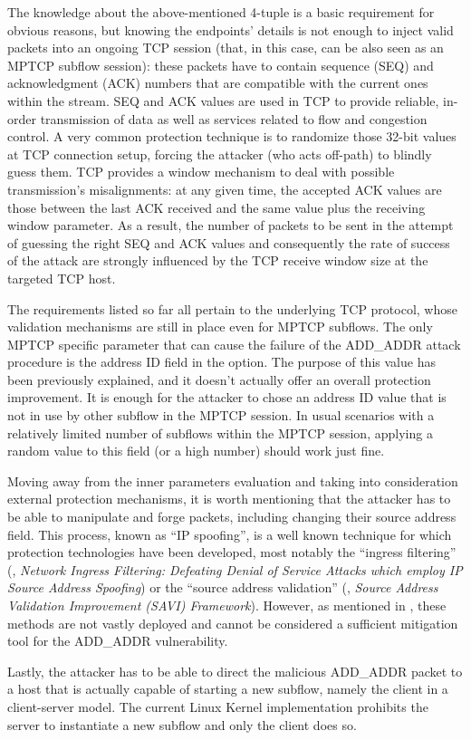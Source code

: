 The knowledge about the above-mentioned 4-tuple is a basic requirement for obvious reasons, but knowing the endpoints' details is not enough to inject valid packets into an ongoing TCP session (that, in this case, can be also seen as an MPTCP subflow session): these packets have to contain sequence (SEQ) and acknowledgment (ACK) numbers that are compatible with the current ones within the stream. SEQ and ACK values are used in TCP to provide reliable, in-order transmission of data as well as services related to flow and congestion control. A very common protection technique is to randomize those 32-bit values at TCP connection setup, forcing the attacker (who acts off-path) to blindly guess them. TCP provides a window mechanism to deal with possible transmission's misalignments: at any given time, the accepted ACK values are those between the last ACK received and the same value plus the receiving window parameter. As a result, the number of packets to be sent in the attempt of guessing the right SEQ and ACK values and consequently the rate of success of the attack are strongly influenced by the TCP receive window size at the targeted TCP host.

The requirements listed so far all pertain to the underlying TCP protocol, whose validation mechanisms are still in place even for MPTCP subflows. The only MPTCP specific parameter that can cause the failure of the ADD\_ADDR attack procedure is the address ID field in the option. The purpose of this value has been previously explained, and it doesn't actually offer an overall protection improvement. It is enough for the attacker to chose an address ID value that is not in use by other subflow in the MPTCP session. In usual scenarios with a relatively limited number of subflows within the MPTCP session, applying a random value to this field (or a high number) should work just fine.

Moving away from the inner parameters evaluation and taking into consideration external protection mechanisms, it is worth mentioning that the attacker has to be able to manipulate and forge packets, including changing their source address field. This process, known as ``IP spoofing'', is a well known technique for which protection technologies have been developed, most notably the ``ingress filtering'' (, \textit{Network Ingress Filtering: Defeating Denial of Service Attacks which employ IP Source Address Spoofing}) or the ``source address validation'' (, \textit{Source Address Validation Improvement (SAVI) Framework}). However, as mentioned in , these methods are not vastly deployed and cannot be considered a sufficient mitigation tool for the ADD\_ADDR vulnerability. %

Lastly, the attacker has to be able to direct the malicious ADD\_ADDR packet to a host that is actually capable of starting a new subflow, namely the client in a client-server model. The current Linux Kernel implementation prohibits the server to instantiate a new subflow and only the client does so.
